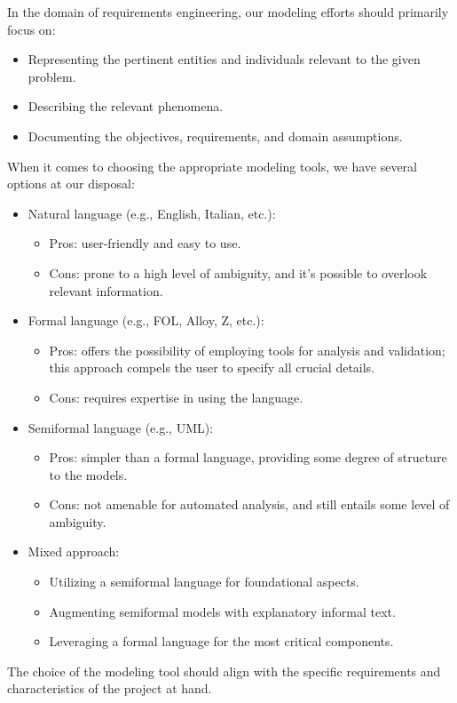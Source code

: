 In the domain of requirements engineering, our modeling efforts should primarily focus on:
\begin{itemize}
    \item Representing the pertinent entities and individuals relevant to the given problem.
    \item Describing the relevant phenomena.
    \item Documenting the objectives, requirements, and domain assumptions.
\end{itemize}
When it comes to choosing the appropriate modeling tools, we have several options at our disposal:
\begin{itemize}
    \item Natural language (e.g., English, Italian, etc.):
        \begin{itemize}
            \item Pros: user-friendly and easy to use.
            \item Cons: prone to a high level of ambiguity, and it's possible to overlook relevant information.
        \end{itemize}
    \item Formal language (e.g., FOL, Alloy, Z, etc.):
        \begin{itemize}
            \item Pros: offers the possibility of employing tools for analysis and validation; this approach compels the user to specify all crucial details.
            \item Cons: requires expertise in using the language.
        \end{itemize}
    \item Semiformal language (e.g., UML):
        \begin{itemize}
            \item Pros: simpler than a formal language, providing some degree of structure to the models.
            \item Cons: not amenable for automated analysis, and still entails some level of ambiguity.
        \end{itemize}
    \item Mixed approach:             
        \begin{itemize}
            \item Utilizing a semiformal language for foundational aspects.
            \item Augmenting semiformal models with explanatory informal text.
            \item Leveraging a formal language for the most critical components.
        \end{itemize}
\end{itemize}
The choice of the modeling tool should align with the specific requirements and characteristics of the project at hand.